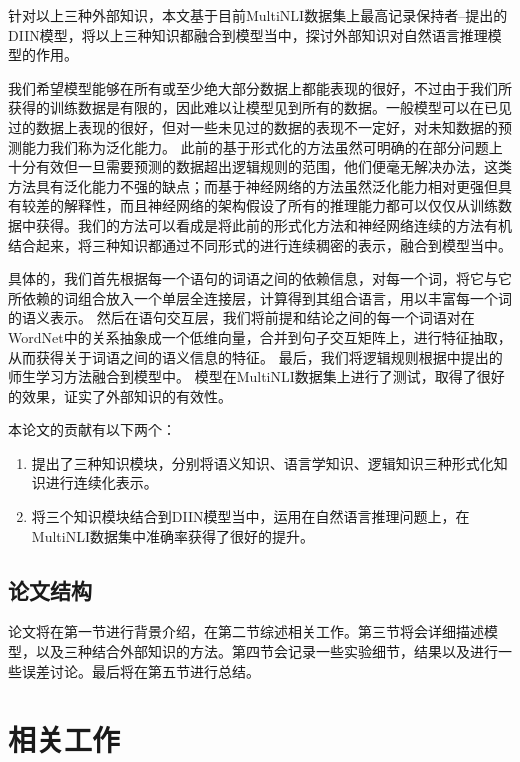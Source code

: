 \documentclass[UTF8,11pt,a4paper,nofonts]{ctexart}
\begin{document}
针对以上三种外部知识，本文基于目前MultiNLI数据集上最高记录保持者--\cite{yichen2018nli}提出的DIIN模型，将以上三种知识都融合到模型当中，探讨外部知识对自然语言推理模型的作用。

我们希望模型能够在所有或至少绝大部分数据上都能表现的很好，不过由于我们所获得的训练数据是有限的，因此难以让模型见到所有的数据。一般模型可以在已见过的数据上表现的很好，但对一些未见过的数据的表现不一定好，对未知数据的预测能力我们称为泛化能力。
此前的基于形式化的方法虽然可明确的在部分问题上十分有效但一旦需要预测的数据超出逻辑规则的范围，他们便毫无解决办法，这类方法具有泛化能力不强的缺点；而基于神经网络的方法虽然泛化能力相对更强但具有较差的解释性，而且神经网络的架构假设了所有的推理能力都可以仅仅从训练数据中获得。我们的方法可以看成是将此前的形式化方法和神经网络连续的方法有机结合起来，将三种知识都通过不同形式的进行连续稠密的表示，融合到模型当中。

具体的，我们首先根据每一个语句的词语之间的依赖信息，对每一个词，将它与它所依赖的词组合放入一个单层全连接层，计算得到其组合语言，用以丰富每一个词的语义表示。
然后在语句交互层，我们将前提和结论之间的每一个词语对在WordNet中的关系抽象成一个低维向量，合并到句子交互矩阵上，进行特征抽取，从而获得关于词语之间的语义信息的特征。
最后，我们将逻辑规则根据\cite{Hu2016HarnessingDN}中提出的师生学习方法融合到模型中。
模型在MultiNLI数据集上进行了测试，取得了很好的效果，证实了外部知识的有效性。

本论文的贡献有以下两个：

\begin{enumerate}
\item 提出了三种知识模块，分别将语义知识、语言学知识、逻辑知识三种形式化知识进行连续化表示。
\item 将三个知识模块结合到DIIN模型当中，运用在自然语言推理问题上，在MultiNLI数据集中准确率获得了很好的提升。
\end{enumerate}


\subsection{论文结构}

论文将在第一节进行背景介绍，在第二节综述相关工作。第三节将会详细描述模型，以及三种结合外部知识的方法。第四节会记录一些实验细节，结果以及进行一些误差讨论。最后将在第五节进行总结。

\newpage
\section{相关工作}
\end{document}
